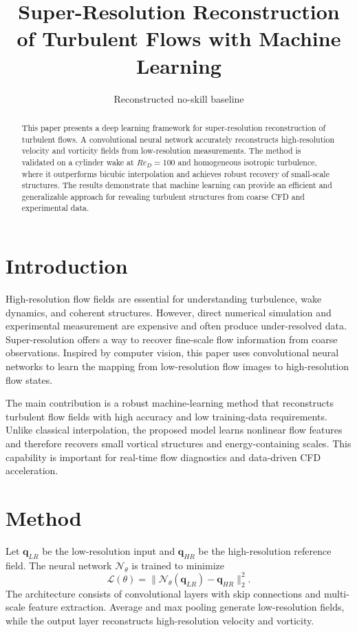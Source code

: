 \documentclass[11pt]{article}
\title{Super-Resolution Reconstruction of Turbulent Flows with Machine Learning}
\author{Reconstructed no-skill baseline}
\date{}
\begin{document}
\maketitle

\begin{abstract}
This paper presents a deep learning framework for super-resolution reconstruction of turbulent flows. A convolutional neural network accurately reconstructs high-resolution velocity and vorticity fields from low-resolution measurements. The method is validated on a cylinder wake at $Re_D=100$ and homogeneous isotropic turbulence, where it outperforms bicubic interpolation and achieves robust recovery of small-scale structures. The results demonstrate that machine learning can provide an efficient and generalizable approach for revealing turbulent structures from coarse CFD and experimental data.
\end{abstract}

\section{Introduction}
High-resolution flow fields are essential for understanding turbulence, wake dynamics, and coherent structures. However, direct numerical simulation and experimental measurement are expensive and often produce under-resolved data. Super-resolution offers a way to recover fine-scale flow information from coarse observations. Inspired by computer vision, this paper uses convolutional neural networks to learn the mapping from low-resolution flow images to high-resolution flow states.

The main contribution is a robust machine-learning method that reconstructs turbulent flow fields with high accuracy and low training-data requirements. Unlike classical interpolation, the proposed model learns nonlinear flow features and therefore recovers small vortical structures and energy-containing scales. This capability is important for real-time flow diagnostics and data-driven CFD acceleration.

\section{Method}
Let $\mathbf{q}_{LR}$ be the low-resolution input and $\mathbf{q}_{HR}$ be the high-resolution reference field. The neural network $\mathcal{N}_\theta$ is trained to minimize
\begin{equation}
\mathcal{L}(\theta)=\|\mathcal{N}_\theta(\mathbf{q}_{LR})-\mathbf{q}_{HR}\|_2^2.
\end{equation}
The architecture consists of convolutional layers with skip connections and multi-scale feature extraction. Average and max pooling generate low-resolution fields, while the output layer reconstructs high-resolution velocity and vorticity.
\end{document}
